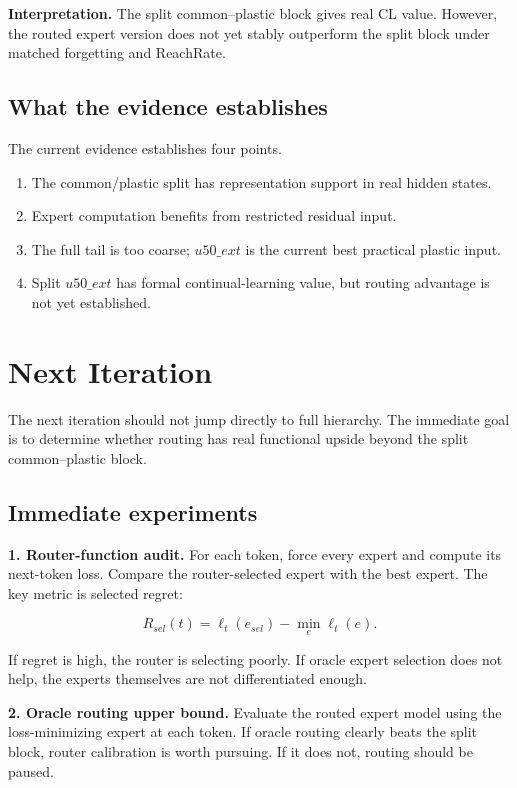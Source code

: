 \documentclass[11pt]{article}
\begin{document}
\textbf{Interpretation.} The split common--plastic block gives real CL value. However, the routed expert version does not yet stably outperform the split block under matched forgetting and ReachRate.

\subsection{What the evidence establishes}

The current evidence establishes four points.

\begin{enumerate}[leftmargin=1.5em]
    \item The common/plastic split has representation support in real hidden states.
    \item Expert computation benefits from restricted residual input.
    \item The full tail is too coarse; $u50\_ext$ is the current best practical plastic input.
    \item Split $u50\_ext$ has formal continual-learning value, but routing advantage is not yet established.
\end{enumerate}

\section{Next Iteration}

The next iteration should not jump directly to full hierarchy. The immediate goal is to determine whether routing has real functional upside beyond the split common--plastic block.

\subsection{Immediate experiments}

\textbf{1. Router-function audit.}
For each token, force every expert and compute its next-token loss. Compare the router-selected expert with the best expert. The key metric is selected regret:

$$
R_{sel}(t)=\ell_t(e_{sel})-\min_e\ell_t(e).
$$

If regret is high, the router is selecting poorly. If oracle expert selection does not help, the experts themselves are not differentiated enough.

\textbf{2. Oracle routing upper bound.}
Evaluate the routed expert model using the loss-minimizing expert at each token. If oracle routing clearly beats the split block, router calibration is worth pursuing. If it does not, routing should be paused.
\end{document}
